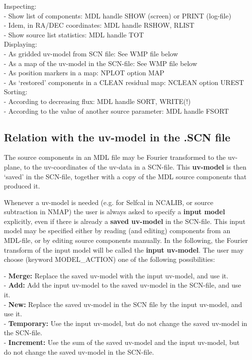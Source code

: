 Inspecting:\\ 
- Show list of components: MDL handle SHOW (screen) or PRINT (log-file)\\ 
- Idem, in RA/DEC coordinates: MDL handle RSHOW, RLIST\\ 
- Show source list statistics: MDL handle TOT \\ 

Displaying:\\ 
- As gridded uv-model from SCN file: See WMP file below\\ 
- As a map of the uv-model in the SCN-file: See WMP file below\\ 
- As position markers in a map: NPLOT option MAP\\ 
- As `restored' components in a CLEAN residual map: NCLEAN option UREST \\ 

Sorting:\\ 
- According to decreasing flux: MDL handle SORT, WRITE(!)\\ 
- According to the value of another source parameter: MDL handle FSORT\\ 


\subsection{Relation with the uv-model in the .SCN file} 
\label{mdl.uvmodel} 

	The source components in an MDL file may be Fourier transformed to the
uv-plane, to the uv-coordinates of the uv-data in a SCN-file. 
This {\bf uv-model} is then `saved' in the SCN-file, together with a copy of
the MDL source components that produced it. 

	Whenever a uv-model is needed (e.g.  for Selfcal in NCALIB, or source
subtraction in NMAP) the user is always asked to specify a {\bf input model}
explicitly, even if there is already a {\bf saved uv-model} in the SCN-file.
This input model may be specified either by reading 
(and editing) components from an MDL-file, or by editing source components
manually.  In the following, the Fourier transform of the input model will be
called the {\bf input uv-model}.  The user may choose (keyword MODEL\_ACTION)
one of the following possibilities: 

- {\bf Merge:} Replace the saved uv-model with the input uv-model, 
	and use it. \\ 
- {\bf Add:} Add the input uv-model to the saved uv-model in the SCN-file, 
	and use it.\\ 
- {\bf New:} Replace the saved uv-model in the SCN file by the input uv-model, 
	and use it.\\ 
- {\bf Temporary:} Use the input uv-model, 
	but do not change the saved uv-model in the SCN-file.\\ 
- {\bf Increment:} Use the sum of the saved uv-model and the input uv-model, 
	but do not change the saved uv-model in the SCN-file. \\ 

